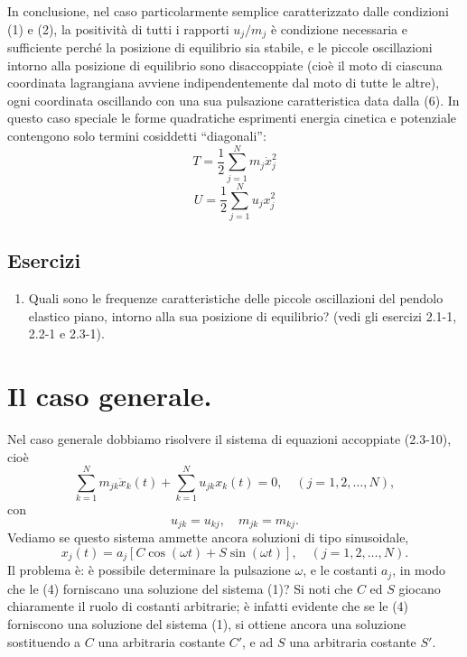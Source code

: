 \documentclass[11pt, a4paper]{book}
\numberwithin{equation}{section}
\newenvironment{esercizi}{\subsection*{Esercizi}\begin{enumerate}}{\end{enumerate}}
\begin{document}
In conclusione, nel caso particolarmente semplice caratterizzato dalle condizioni (1) e (2), la positività di tutti i rapporti $u_j / m_j$ è condizione necessaria e sufficiente perché la posizione di equilibrio sia stabile, e le piccole oscillazioni intorno alla posizione di equilibrio sono disaccoppiate (cioè il moto di ciascuna coordinata lagrangiana avviene indipendentemente dal moto di tutte le altre), ogni coordinata oscillando con una sua pulsazione caratteristica data dalla (6). In questo caso speciale le forme quadratiche esprimenti energia cinetica e potenziale contengono solo termini cosiddetti ``diagonali'':
\begin{equation}
T = \frac{1}{2} \sum_{j=1}^{N} m_j \dot{x}_j^2
\end{equation}
\begin{equation}
U = \frac{1}{2} \sum_{j=1}^{N} u_j x_j^2
\end{equation}

\begin{esercizi}
\item Quali sono le frequenze caratteristiche delle piccole oscillazioni del pendolo elastico piano, intorno alla sua posizione di equilibrio? (vedi gli esercizi 2.1-1, 2.2-1 e 2.3-1).
\end{esercizi}

\section{Il caso generale.}

Nel caso generale dobbiamo risolvere il sistema di equazioni accoppiate (2.3-10), cioè
\begin{equation}
\sum_{k=1}^{N} m_{jk} \ddot{x}_k(t) + \sum_{k=1}^{N} u_{jk} x_k(t) = 0, \quad (j = 1, 2, \dots, N),
\end{equation}
con
\begin{equation}
u_{jk} = u_{kj}, \quad m_{jk} = m_{kj}.
\end{equation}
Vediamo se questo sistema ammette ancora soluzioni di tipo sinusoidale,
\begin{equation}
x_j(t) = a_j [C \cos(\omega t) + S \sin(\omega t)], \quad (j = 1, 2, \dots, N).
\end{equation}
Il problema è: è possibile determinare la pulsazione $\omega$, e le costanti $a_j$, in modo che le (4) forniscano una soluzione del sistema (1)? Si noti che $C$ ed $S$ giocano chiaramente il ruolo di costanti arbitrarie; è infatti evidente che se le (4) forniscono una soluzione del sistema (1), si ottiene ancora una soluzione sostituendo a $C$ una arbitraria costante $C'$, e ad $S$ una arbitraria costante $S'$.
\end{document}
